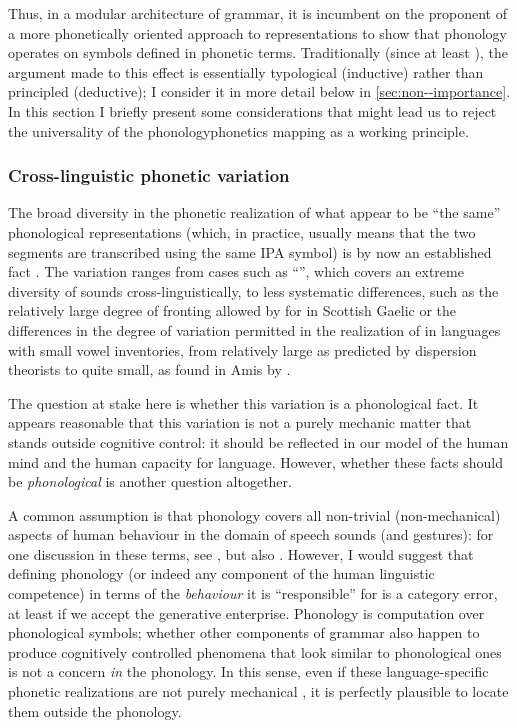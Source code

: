 Thus, in a modular architecture of grammar, it is incumbent on the proponent of a more phonetically oriented approach to representations to show that phonology operates on symbols defined in phonetic terms. Traditionally (\ie since at least \citealt{jfh}), the argument made to this effect is essentially typological (inductive) rather than principled (deductive); I consider it in more detail below in \cref{sec:non--importance}. In this section I briefly present some considerations that might lead us to reject the universality of the phonology\endash phonetics mapping as a working principle.

\subsubsection{Cross-linguistic phonetic variation}
\label{sec:cross-ling-vari}

The broad diversity in the phonetic realization of what appear to be \enquote{the same} phonological representations (which, in practice, usually means that the two segments are transcribed using the same IPA symbol) is by now an established fact \citep{ladefoged84}. The variation ranges from cases such as \enquote{\ipa{[r]}}, which covers an extreme diversity of sounds cross\hyp linguistically, to less systematic differences, such as the relatively large degree of fronting allowed by for \ipa{[u]} in Scottish Gaelic \citep{ladefogedetal-scg} or the differences in the degree of variation permitted in the realization of \ipa{[i]} in languages with small vowel inventories, from relatively large as predicted by dispersion theorists \citep[\egm][]{liljencrants72:_numer_simul_vowel_qualit_system,flemming1995} to quite small, as found in Amis by \citet{maddieson95:_amis}.

The question at stake here is whether this variation is a phonological fact. It appears reasonable that this variation is not a purely mechanic matter that stands outside cognitive control: it should be reflected in our model of the human mind and the human capacity for language. However, whether these facts should be \emph{phonological} is another question altogether.

A common assumption is that phonology covers all non\hyp trivial (\ie non\hyp mechanical) aspects of human behaviour in the domain of speech sounds (and gestures): for one discussion in these terms, see \citet{hammarberg76}, but also \citet{pierrehumbert00:_concep,pierrehumbert02:_word}. However, I would suggest that defining phonology (or indeed any component of the human linguistic competence) in terms of the \emph{behaviour} it is \enquote{responsible} for is a category error, at least if we accept the generative enterprise. Phonology is computation over phonological symbols; whether other components of grammar also happen to produce cognitively controlled phenomena that look similar to phonological ones is not a concern \emph{in} the phonology. In this sense, even if these language\hyp specific phonetic realizations are not purely mechanical \citep{keating90:_phonet,pierrehumbert90:_phonol,phon-knowledge,hale-kissock-reiss}, it is perfectly plausible to locate them outside the phonology.

